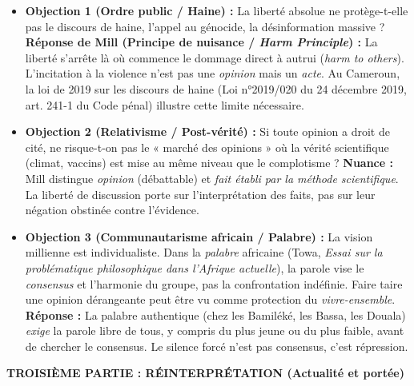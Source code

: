 \documentclass[11pt]{article}
\begin{document}
\begin{exoresolu}
\begin{itemize}
    \item \textbf{Objection 1 (Ordre public / Haine) :} La liberté absolue ne protège-t-elle pas le discours de haine, l'appel au génocide, la désinformation massive ? \textbf{Réponse de Mill (Principe de nuisance / \emph{Harm Principle}) :} La liberté s'arrête là où commence le dommage direct à autrui (\emph{harm to others}). L'incitation à la violence n'est pas une \emph{opinion} mais un \emph{acte}. Au Cameroun, la loi de 2019 sur les discours de haine (Loi n°2019/020 du 24 décembre 2019, art. 241-1 du Code pénal) illustre cette limite nécessaire.
    \item \textbf{Objection 2 (Relativisme / Post-vérité) :} Si toute opinion a droit de cité, ne risque-t-on pas le « marché des opinions » où la vérité scientifique (climat, vaccins) est mise au même niveau que le complotisme ? \textbf{Nuance :} Mill distingue \emph{opinion} (débattable) et \emph{fait établi par la méthode scientifique}. La liberté de discussion porte sur l'interprétation des faits, pas sur leur négation obstinée contre l'évidence.
    \item \textbf{Objection 3 (Communautarisme africain / Palabre) :} La vision millienne est individualiste. Dans la \emph{palabre} africaine (Towa, \emph{Essai sur la problématique philosophique dans l'Afrique actuelle}), la parole vise le \emph{consensus} et l'harmonie du groupe, pas la confrontation indéfinie. Faire taire une opinion dérangeante peut être vu comme protection du \emph{vivre-ensemble}. \textbf{Réponse :} La palabre authentique (chez les Bamiléké, les Bassa, les Douala) \emph{exige} la parole libre de tous, y compris du plus jeune ou du plus faible, avant de chercher le consensus. Le silence forcé n'est pas consensus, c'est répression.
\end{itemize}

\textbf{TROISIÈME PARTIE : RÉINTERPRÉTATION (Actualité et portée)}


\end{exoresolu}
\end{document}
